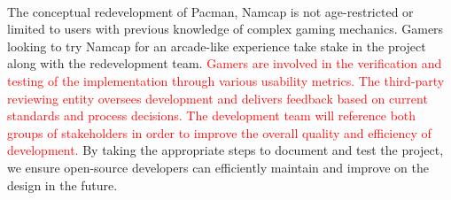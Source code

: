 \documentclass{article}
\begin{document}
\paragraph{}
The conceptual redevelopment of Pacman, Namcap is not age-restricted or limited
to users with previous knowledge of complex gaming mechanics. Gamers looking to
try Namcap for an arcade-like experience take stake in the project along with
the redevelopment team. \textcolor{red}{Gamers are involved in the verification and testing of the implementation through various usability metrics.  The third-party reviewing entity oversees development and delivers feedback based on current standards and process decisions. The development team will reference both groups of stakeholders in order to improve the overall quality and efficiency of development.} By taking the appropriate steps to document and test the project, we
ensure open-source developers can efficiently maintain and improve on the design
in the future.
\end{document}
